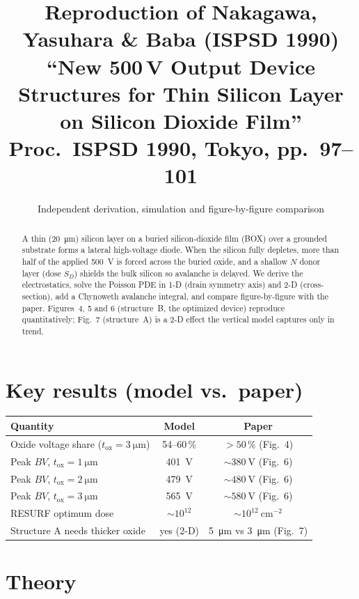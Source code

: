 \documentclass[11pt]{article}
\title{\vspace{-1.2cm}\textbf{Reproduction of Nakagawa, Yasuhara \& Baba
(ISPSD 1990)}\\[4pt]
\large ``New 500\,V Output Device Structures for Thin Silicon Layer on
Silicon Dioxide Film''\\ \normalsize Proc.\ ISPSD 1990, Tokyo, pp.~97--101}
\author{Independent derivation, simulation and figure-by-figure comparison}
\date{}
\newcommand{\SD}{S_{D}}
\newcommand{\tox}{t_{\mathrm{ox}}}
\begin{document}
\maketitle
\vspace{-0.8cm}

\begin{abstract}
\noindent A thin (\SI{20}{\micro\meter}) silicon layer on a buried silicon-dioxide
film (BOX) over a grounded substrate forms a lateral high-voltage diode. When the
silicon fully depletes, more than half of the applied \SI{500}{\volt} is forced
across the buried oxide, and a shallow $N$ donor layer (dose $\SD$) shields the
bulk silicon so avalanche is delayed. We derive the electrostatics, solve the
Poisson PDE in 1-D (drain symmetry axis) and 2-D (cross-section), add a Chynoweth
avalanche integral, and compare figure-by-figure with the paper. Figures~4, 5 and
6 (structure~B, the optimized device) reproduce quantitatively; Fig.~7
(structure~A) is a 2-D effect the vertical model captures only in trend.
\end{abstract}

\section*{Key results (model vs.\ paper)}
\begin{center}
\begin{tabular}{@{}lcc@{}}
\toprule
Quantity & Model & Paper \\
\midrule
Oxide voltage share ($\tox=\SI{3}{\micro\meter}$) & 54--60\,\% & $>50\,\%$ (Fig.~4) \\
Peak $BV$, $\tox=\SI{1}{\micro\meter}$ & \SI{401}{\volt} & $\sim\!\SI{380}{\volt}$ (Fig.~6) \\
Peak $BV$, $\tox=\SI{2}{\micro\meter}$ & \SI{479}{\volt} & $\sim\!\SI{480}{\volt}$ (Fig.~6) \\
Peak $BV$, $\tox=\SI{3}{\micro\meter}$ & \SI{565}{\volt} & $\sim\!\SI{580}{\volt}$ (Fig.~6) \\
RESURF optimum dose & $\sim\!10^{12}$ & $\sim\!10^{12}\ \mathrm{cm^{-2}}$ \\
Structure A needs thicker oxide & yes (2-D) & \SI{5}{\micro\meter} vs \SI{3}{\micro\meter} (Fig.~7) \\
\bottomrule
\end{tabular}
\end{center}

\section{Theory}
\end{document}
